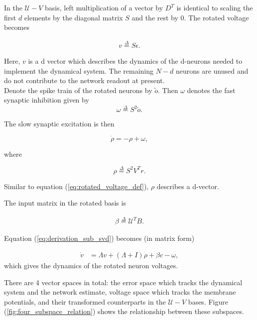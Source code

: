 \begin{enumerate}
In the $\mathcal{U}-V$ basis, left multiplication of a vector by $D^T$ is identical to scaling the first $d$ elements by the diagonal matrix $S$ and the rest by 0. The rotated voltage becomes

\begin{align}
\label{eq:rotated_voltage_def}
v \overset{\Delta}{=} S \epsilon.
\end{align}

Here, $v$ is a d vector which describes the dynamics of the d-neurons needed to implement the dynamical system. The remaining $N-d$ neurons are unused and do not contribute to the network readout at present.   \\

Denote the spike train of the rotated neurons by $\tilde{o}$. Then $\omega$ denotes the fast synaptic inhibition given by 
$$
    \omega \overset{\Delta}{=} S^2 \tilde{o}.
$$

The slow synaptic excitation is then

\begin{equation}
\label{eq:rho_dot}
    \dot{\rho} = -\rho + \omega, 
\end{equation}

where 

$$
	\rho \overset{\Delta}{=} S^2 V^T r.
$$

Similar to equation (\ref{eq:rotated_voltage_def}), $\rho$ describes a d-vector. 

The input matrix in the rotated basis is 

\begin{align}
\label{eq:rotated_input_matrix_def}
\beta \overset{\Delta}{=} \mathcal{U}^T  B.
\end{align}

Equation (\ref{eq:derivation_sub_svd}) becomes (in matrix form)

\begin{align}
\label{eq:rotated_voltage_dynamics}
    \dot{v} &= 
    \Lambda v
    +
    (\Lambda + I) \rho 
    +
     \beta c
    -
    \omega,
   \end{align}
which gives the dynamics of the rotated neuron voltages. 

There are 4 vector spaces in total: the error space which tracks the dynamical system and the network estimate, voltage space which tracks the membrane potentials, and their transformed counterparts in the $\mathcal{U}-V$ bases. Figure (\ref{fig:four_subspace_relation}) shows the relationship between these subspaces. 


\end{enumerate}
